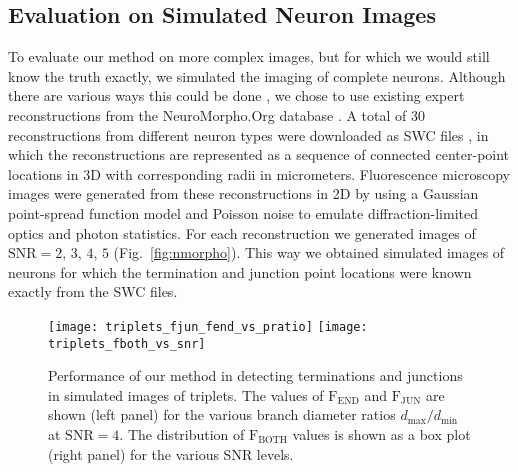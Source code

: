 \documentclass[twocolumn,natbib]{svjour3}
\begin{document}
\subsection{Evaluation on Simulated Neuron Images}
\label{subsec:experiments-simulated}
To evaluate our method on more complex images, but for which we would still know the truth exactly, we simulated the imaging of complete neurons. Although there are various ways this could be done \citep{Koene-2009,vasilkoski2009detection}, we chose to use existing expert reconstructions from the NeuroMorpho.Org database \citep{ascoli2007neuromorpho}. A total of 30 reconstructions from different neuron types were downloaded as SWC files \citep{cannon1998line}, in which the reconstructions are represented as a sequence of connected center-point locations in 3D with corresponding radii in micrometers. Fluorescence microscopy images were generated from these reconstructions in 2D by using a Gaussian point-spread function model and Poisson noise to emulate diffraction-limited optics and photon statistics. For each reconstruction we generated images of $\textrm{SNR}=2$, $3$, $4$, $5$ (Fig.~\ref{fig:nmorpho}). This way we obtained simulated images of neurons for which the termination and junction point locations were known exactly from the SWC files.

\begin{figure}[!t]
\centering
\texttt{[image: triplets\_fjun\_fend\_vs\_pratio]}\hfill
\texttt{[image: triplets\_fboth\_vs\_snr]}
\caption{Performance of our method in detecting terminations and junctions in simulated images of triplets. The values of $\textrm{F}_{\textrm{END}}$ and $\textrm{F}_{\textrm{JUN}}$ are shown (left panel) for the various branch diameter ratios $d_{\max}/d_{\min}$ at $\textrm{SNR}=4$. The distribution of $\textrm{F}_{\textrm{BOTH}}$ values is shown as a box plot (right panel) for the various SNR levels.}
\label{fig:results-triplets}
\end{figure}
\end{document}
